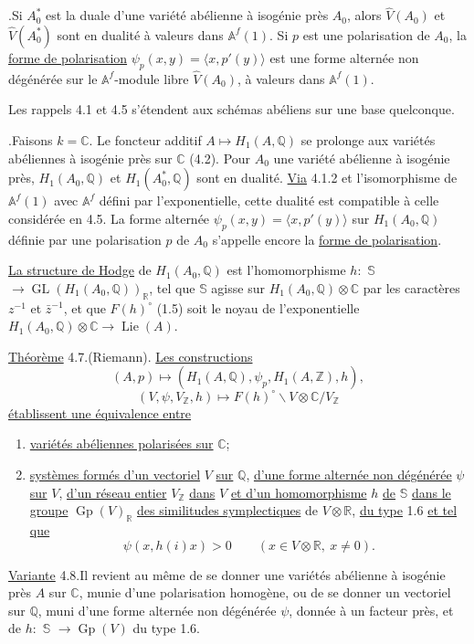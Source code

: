\documentclass[10pt]{article}
\newcommand{\Af}{\mathbb A^f}
\newcommand{\C}{\mathbb C}
\newcommand{\Q}{\mathbb Q}
\newcommand{\R}{\mathbb R}
\newcommand{\Z}{\mathbb Z}
\newcommand{\bS}{\mathbb S}
\newcommand{\GL}{\operatorname{GL}}
\newcommand{\Gp}{\operatorname{Gp}}
\newcommand{\Lie}{\operatorname{Lie}}
\begin{document}
.\quad Si $A_0^*$ est la duale d'une variété abélienne à isogénie près $A_0$, alors $\widehat V(A_0)$ et $\widehat V(A_0^*)$ sont en dualité à valeurs dans $\Af(1)$. Si $p$ est une polarisation de $A_0$, la \uline{forme de polarisation} $\psi_p(x,y)=\langle x,p'(y)\rangle$ est une forme alternée non dégénérée sur le $\Af$-module libre $\widehat V(A_0)$, à valeurs dans $\Af(1)$.

Les rappels 4.1 et 4.5 s'étendent aux schémas abéliens sur une base quelconque.

.\quad Faisons $k=\C$. Le foncteur additif $A\mapsto H_1(A,\Q)$ se prolonge aux variétés abéliennes à isogénie près sur $\C$ (4.2). Pour $A_0$ une variété abélienne à isogénie près, $H_1(A_0,\Q)$ et $H_1(A_0^*,\Q)$ sont en dualité. \uline{Via} 4.1.2 et l'isomorphisme de $\Af(1)$ avec $\Af$ défini par l'exponentielle, cette dualité est compatible à celle considérée en 4.5. La forme alternée $\psi_p(x,y)=\langle x,p'(y)\rangle$ sur $H_1(A_0,\Q)$ définie par une polarisation $p$ de $A_0$ s'appelle encore la \uline{forme de polarisation}.

\uline{La structure de Hodge} de $H_1(A_0,\Q)$ est l'homomorphisme $h:$ \uline{$\bS$} $\longrightarrow \GL(H_1(A_0,\Q))_\R$, tel que \uline{$\bS$} agisse sur $H_1(A_0,\Q)\otimes\C$ par les caractères $z^{-1}$ et $\bar z^{-1}$, et que $F(h)^\circ$ (1.5) soit le noyau de l'exponentielle $H_1(A_0,\Q)\otimes\C\longrightarrow\Lie(A)$.

\noindent \uline{Théorème} 4.7.\quad (Riemann). \uline{Les constructions}
\[
(A,p)\longmapsto (H_1(A,\Q),\psi_p,H_1(A,\Z),h),
\]
\[
(V,\psi,V_\Z,h)\longmapsto
F(h)^\circ\backslash V\otimes\C/V_\Z
\]
\uline{établissent une équivalence entre}
\begin{enumerate}[label=(\alph*)]
\item \uline{variétés abéliennes polarisées sur} $\C$;
\item \uline{systèmes formés d'un vectoriel} $V$ \uline{sur} $\Q$, \uline{d'une forme alternée non dégénérée} $\psi$ \uline{sur} $V$, \uline{d'un réseau entier} $V_\Z$ \uline{dans} $V$ \uline{et d'un homomorphisme} $h$ \uline{de} \uline{$\bS$} \uline{dans le groupe} $\Gp(V)_\R$ \uline{des similitudes symplectiques} de $V\otimes\R$, \uline{du type} 1.6 \uline{et tel que}
\[
\psi(x,h(i)x)>0\qquad(x\in V\otimes\R,\ x\ne0).
\]
\end{enumerate}

\noindent \uline{Variante} 4.8.\quad Il revient au même de se donner une variétés abélienne à isogénie près $A$ sur $\C$, munie d'une polarisation homogène, ou de se donner un vectoriel sur $\Q$, muni d'une forme alternée non dégénérée $\psi$, donnée à un facteur près, et de $h:$ \uline{$\bS$} $\longrightarrow\Gp(V)$ du type 1.6.
\end{document}

